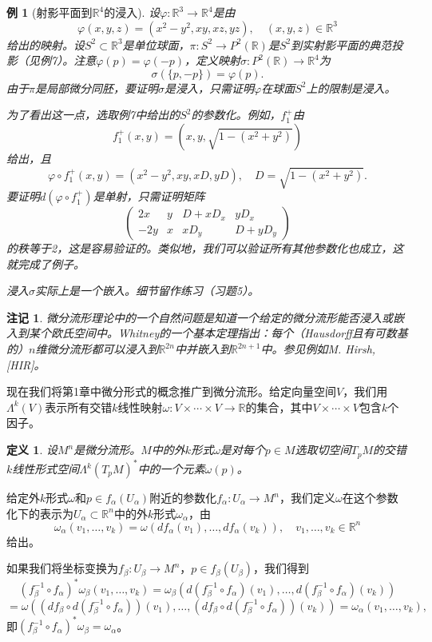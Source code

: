 \documentclass[12pt,a4paper]{ctexbook}
\newtheorem{definition}[theorem]{定义}
\newtheorem{remark}[theorem]{注记}
\newtheorem{example}[theorem]{例}
\begin{document}
\begin{example}[射影平面到$\mathbb{R}^4$的浸入]
设$\varphi:\mathbb{R}^3\to\mathbb{R}^4$是由
$$\varphi(x,y,z) = (x^2-y^2, xy, xz, yz),\quad (x,y,z)\in\mathbb{R}^3$$
给出的映射。设$S^2\subset\mathbb{R}^3$是单位球面，$\pi:S^2\to P^2(\mathbb{R})$是$S^2$到实射影平面的典范投影（见例7）。注意$\varphi(p)=\varphi(-p)$，定义映射$\sigma:P^2(\mathbb{R})\to\mathbb{R}^4$为
$$\sigma(\{p,-p\}) = \varphi(p).$$
由于$\pi$是局部微分同胚，要证明$\sigma$是浸入，只需证明$\varphi$在球面$S^2$上的限制是浸入。

为了看出这一点，选取例7中给出的$S^2$的参数化。例如，$f_1^+$由
$$f_1^+(x,y) = (x,y,\sqrt{1-(x^2+y^2)})$$
给出，且
$$\varphi\circ f_1^+(x,y) = (x^2-y^2, xy, xD, yD),\quad D = \sqrt{1-(x^2+y^2)}.$$
要证明$d(\varphi\circ f_1^+)$是单射，只需证明矩阵
$$\begin{pmatrix}
2x & y & D + xD_x & yD_x \\
-2y & x & xD_y & D + yD_y
\end{pmatrix}$$
的秩等于2，这是容易验证的。类似地，我们可以验证所有其他参数化也成立，这就完成了例子。

浸入$\sigma$实际上是一个嵌入。细节留作练习（习题5）。
\end{example}

\begin{remark}
微分流形理论中的一个自然问题是知道一个给定的微分流形能否浸入或嵌入到某个欧氏空间中。Whitney的一个基本定理指出：每个（Hausdorff且有可数基的）$n$维微分流形都可以浸入到$\mathbb{R}^{2n}$中并嵌入到$\mathbb{R}^{2n+1}$中。参见例如M. Hirsh, [HIR]。
\end{remark}

现在我们将第1章中微分形式的概念推广到微分流形。给定向量空间$V$，我们用$\Lambda^k(V)$表示所有交错$k$线性映射$\omega:V\times\cdots\times V\to\mathbb{R}$的集合，其中$V\times\cdots\times V$包含$k$个因子。

\begin{definition}
设$M^n$是微分流形。$M$中的外$k$形式$\omega$是对每个$p\in M$选取切空间$T_pM$的交错$k$线性形式空间$\Lambda^k(T_pM)^*$中的一个元素$\omega(p)$。
\end{definition}

给定外$k$形式$\omega$和$p\in f_\alpha(U_\alpha)$附近的参数化$f_\alpha:U_\alpha\to M^n$，我们定义$\omega$在这个参数化下的表示为$U_\alpha\subset\mathbb{R}^n$中的外$k$形式$\omega_\alpha$，由
$$\omega_\alpha(v_1,\ldots,v_k) = \omega(df_\alpha(v_1),\ldots,df_\alpha(v_k)),\quad v_1,\ldots,v_k\in\mathbb{R}^n$$
给出。

如果我们将坐标变换为$f_\beta:U_\beta\to M^n$，$p\in f_\beta(U_\beta)$，我们得到
$$(f_\beta^{-1}\circ f_\alpha)^*\omega_\beta(v_1,\ldots,v_k) = \omega_\beta(d(f_\beta^{-1}\circ f_\alpha)(v_1),\ldots,d(f_\beta^{-1}\circ f_\alpha)(v_k))$$
$$= \omega((df_\beta\circ d(f_\beta^{-1}\circ f_\alpha))(v_1),\ldots,(df_\beta\circ d(f_\beta^{-1}\circ f_\alpha))(v_k)) = \omega_\alpha(v_1,\ldots,v_k),$$
即$(f_\beta^{-1}\circ f_\alpha)^*\omega_\beta = \omega_\alpha$。
\end{document}
